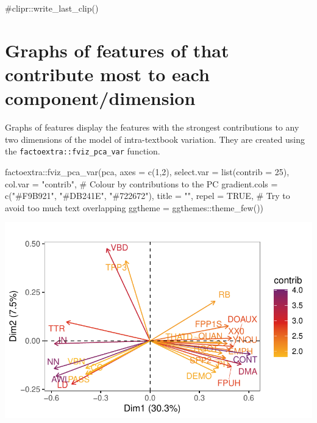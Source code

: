 \documentclass[
  letterpaper,
  DIV=11,
  numbers=noendperiod]{scrreprt}
\newenvironment{Shaded}{\begin{snugshade}}{\end{snugshade}}
\newcommand{\AttributeTok}[1]{\textcolor[rgb]{0.40,0.45,0.13}{#1}}
\newcommand{\CommentTok}[1]{\textcolor[rgb]{0.37,0.37,0.37}{#1}}
\newcommand{\ConstantTok}[1]{\textcolor[rgb]{0.56,0.35,0.01}{#1}}
\newcommand{\DecValTok}[1]{\textcolor[rgb]{0.68,0.00,0.00}{#1}}
\newcommand{\FunctionTok}[1]{\textcolor[rgb]{0.28,0.35,0.67}{#1}}
\newcommand{\NormalTok}[1]{\textcolor[rgb]{0.00,0.23,0.31}{#1}}
\newcommand{\SpecialCharTok}[1]{\textcolor[rgb]{0.37,0.37,0.37}{#1}}
\newcommand{\StringTok}[1]{\textcolor[rgb]{0.13,0.47,0.30}{#1}}
\begin{document}
\begin{Shaded}
\begin{Highlighting}[]
\CommentTok{\#clipr::write\_last\_clip()}
\end{Highlighting}
\end{Shaded}

\section{Graphs of features of that contribute most to each
component/dimension}\label{graphs-of-features-of-that-contribute-most-to-each-componentdimension}

Graphs of features display the features with the strongest contributions
to any two dimensions of the model of intra-textbook variation. They are
created using the \texttt{factoextra::fviz\_pca\_var} function.

\begin{Shaded}
\begin{Highlighting}[]
\NormalTok{factoextra}\SpecialCharTok{::}\FunctionTok{fviz\_pca\_var}\NormalTok{(pca,}
             \AttributeTok{axes =} \FunctionTok{c}\NormalTok{(}\DecValTok{1}\NormalTok{,}\DecValTok{2}\NormalTok{),}
             \AttributeTok{select.var =} \FunctionTok{list}\NormalTok{(}\AttributeTok{contrib =} \DecValTok{25}\NormalTok{),}
             \AttributeTok{col.var =} \StringTok{"contrib"}\NormalTok{, }\CommentTok{\# Colour by contributions to the PC}
             \AttributeTok{gradient.cols =} \FunctionTok{c}\NormalTok{(}\StringTok{"\#F9B921"}\NormalTok{, }\StringTok{"\#DB241E"}\NormalTok{, }\StringTok{"\#722672"}\NormalTok{),}
             \AttributeTok{title =} \StringTok{""}\NormalTok{,}
             \AttributeTok{repel =} \ConstantTok{TRUE}\NormalTok{, }\CommentTok{\# Try to avoid too much text overlapping}
             \AttributeTok{ggtheme =}\NormalTok{ ggthemes}\SpecialCharTok{::}\FunctionTok{theme\_few}\NormalTok{())}
\end{Highlighting}
\end{Shaded}

\includegraphics{G_Ch7_Analysis_files/figure-pdf/graphs-of-variables-1.pdf}
\end{document}
